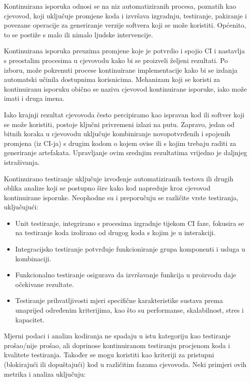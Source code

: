 \documentclass[a4paper,12pt,oneside]{article}
\begin{document}
Kontinuirana isporuka odnosi se na niz automatiziranih procesa, poznatih kao cjevovod, koji uključuje promjene koda i izvršava izgradnju, testiranje, pakiranje i povezane operacije za generiranje verzije softvera koji se može koristiti. Općenito, to se postiže s malo ili nimalo ljudske intervencije.

Kontinuirana isporuka preuzima promjene koje je potvrdio i spojio CI i nastavlja s preostalim procesima u cjevovodu kako bi se proizveli željeni rezultati. Po izboru, može pokrenuti procese kontinuirane implementacije kako bi se izdanja automatski učinila dostupnima korisnicima. Mehanizam koji se koristi za kontinuiranu isporuku obično se naziva cjevovod kontinuirane isporuke, iako može imati i druga imena.

Iako krajnji rezultat cjevovoda često percipiramo kao ispravan kod ili softver koji se može koristiti, postoje ključni privremeni izlazi na putu. Zapravo, jedan od bitnih koraka u cjevovodu uključuje kombiniranje novopotvrđenih i spojenih promjena (iz CI-ja) s drugim kodom o kojem ovise ili s kojim trebaju raditi za generiranje artefakata. Upravljanje ovim srednjim rezultatima vrijedno je daljnjeg istraživanja.

Kontinuirano testiranje uključuje izvođenje automatiziranih testova ili drugih oblika analize koji se postupno šire kako kod napreduje kroz cjevovod kontinuirane isporuke. Neophodne su i preporučuju se različite vrste testiranja, uključujući:

\begin{itemize}
\item Unit testiranje, integrirano s procesima izgradnje tijekom CI faze, fokusira se na testiranje koda izolirano od drugog koda s kojim je u interakciji.
\item Integracijsko testiranje potvrđuje funkcioniranje grupa komponenti i usluga u kombinaciji.
\item Funkcionalno testiranje osigurava da izvršavanje funkcija u proizvodu daje očekivane rezultate.
\item Testiranje prihvatljivosti mjeri specifične karakteristike sustava prema unaprijed određenim kriterijima, kao što su performanse, skalabilnost, stres i kapacitet.
\end{itemize}

Mjerni podaci i analiza kodiranja ne spadaju u istu kategoriju kao testiranje prošao/nije prošao, ali doprinose kontinuiranom testiranju procjenom koda i kvalitete testiranja. Također se mogu koristiti kao kriteriji za pristupni (blokirajući ili dopuštajući) kod u različitim fazama cjevovoda. Neki primjeri ovih metrika i analiza uključuju:
\end{document}
